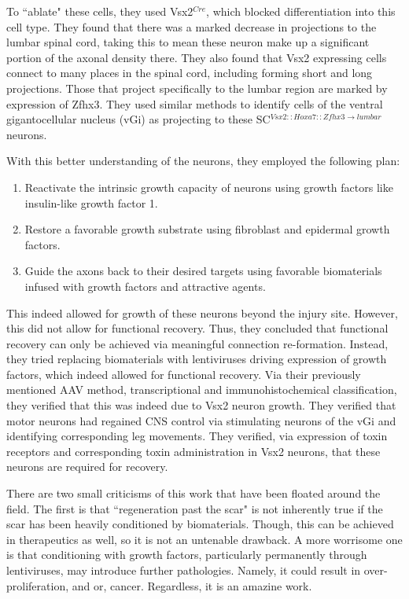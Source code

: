 To ``ablate" these cells, they used Vsx2$^{Cre}$, which blocked differentiation into this cell type. They found that there was a marked decrease in projections to the lumbar spinal cord, taking this to mean these neuron make up a significant portion of the axonal density there. They also found that Vsx2 expressing cells connect to many places in the spinal cord, including forming short and long projections. Those that project specifically to the lumbar region are marked by expression of Zfhx3. They used similar methods to identify cells of the ventral gigantocellular nucleus (vGi) as projecting to these SC$^{Vsx2::Hoxa7::Zfhx3\rightarrow lumbar}$ neurons.\newline

With this better understanding of the neurons, they employed the following plan: 
\begin{enumerate}
    \itemsep 0em
    \item Reactivate the intrinsic growth capacity of neurons using growth factors like insulin-like growth factor 1. 
    \item Restore a favorable growth substrate using fibroblast and epidermal growth factors. 
    \item Guide the axons back to their desired targets using favorable biomaterials infused with growth factors and attractive agents. 
\end{enumerate}

This indeed allowed for growth of these neurons beyond the injury site. However, this did not allow for functional recovery. Thus, they concluded that functional recovery can only be achieved via meaningful connection re-formation. Instead, they tried replacing biomaterials with lentiviruses driving expression of growth factors, which indeed allowed for functional recovery. Via their previously mentioned AAV method, transcriptional and immunohistochemical classification, they verified that this was indeed due to Vsx2 neuron growth. They verified that motor neurons had regained CNS control via stimulating neurons of the vGi and identifying corresponding leg movements. They verified, via expression of toxin receptors and corresponding toxin administration in Vsx2 neurons, that these neurons are required for recovery.\newline

There are two small criticisms of this work that have been floated around the field. The first is that ``regeneration past the scar" is not inherently true if the scar has been heavily conditioned by biomaterials. Though, this can be achieved in therapeutics as well, so it is not an untenable drawback. A more worrisome one is that conditioning with growth factors, particularly permanently through lentiviruses, may introduce further pathologies. Namely, it could result in over-proliferation, and or, cancer. Regardless, it is an amazine work. 

